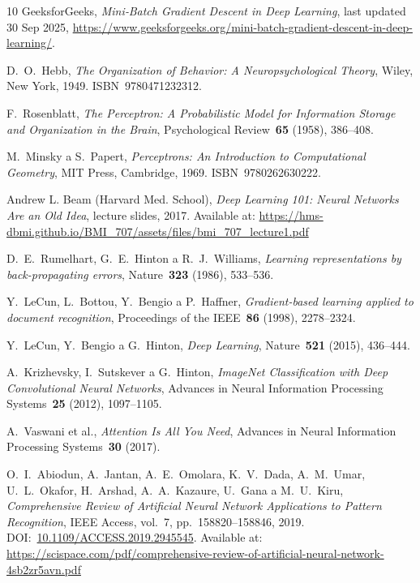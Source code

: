 \begin{thebibliography}{10}
GeeksforGeeks, \textit{Mini‑Batch Gradient Descent in Deep Learning}, last updated 30 Sep 2025, \url{https://www.geeksforgeeks.org/mini-batch-gradient-descent-in-deep-learning/}.

D.~O.~Hebb, \textit{The Organization of Behavior: A Neuropsychological Theory}, Wiley, New York, 1949. ISBN~9780471232312.

F.~Rosenblatt, \textit{The Perceptron: A Probabilistic Model for Information Storage and Organization in the Brain}, Psychological Review~\textbf{65} (1958), 386--408.

M.~Minsky a S.~Papert, \textit{Perceptrons: An Introduction to Computational Geometry}, MIT Press, Cambridge, 1969. ISBN~9780262630222.

Andrew L. Beam (Harvard Med. School), \textit{Deep Learning 101: Neural Networks Are an Old Idea}, lecture slides, 2017. Available at: \url{https://hms-dbmi.github.io/BMI_707/assets/files/bmi_707_lecture1.pdf}

D.~E.~Rumelhart, G.~E.~Hinton a R.~J.~Williams, \textit{Learning representations by back-propagating errors}, Nature~\textbf{323} (1986), 533--536.

Y.~LeCun, L.~Bottou, Y.~Bengio a P.~Haffner, \textit{Gradient-based learning applied to document recognition}, Proceedings of the IEEE~\textbf{86} (1998), 2278--2324.

Y.~LeCun, Y.~Bengio a G.~Hinton, \textit{Deep Learning}, Nature~\textbf{521} (2015), 436--444.

A.~Krizhevsky, I.~Sutskever a G.~Hinton, \textit{ImageNet Classification with Deep Convolutional Neural Networks}, 
Advances in Neural Information Processing Systems~\textbf{25} (2012), 1097--1105.

A.~Vaswani et al., \textit{Attention Is All You Need}, 
Advances in Neural Information Processing Systems~\textbf{30} (2017).

O.~I.~Abiodun, A.~Jantan, A.~E.~Omolara, K.~V.~Dada, A.~M.~Umar, U.~L.~Okafor, H.~Arshad, A.~A.~Kazaure, U.~Gana a M.~U.~Kiru, 
\textit{Comprehensive Review of Artificial Neural Network Applications to Pattern Recognition}, 
IEEE Access, vol.~7, pp.~158820--158846, 2019. 
DOI:~\url{10.1109/ACCESS.2019.2945545}. 
Available at: \url{https://scispace.com/pdf/comprehensive-review-of-artificial-neural-network-4sb2zr5avn.pdf}


\end{thebibliography}
